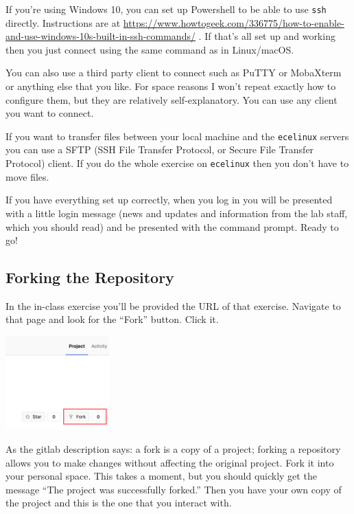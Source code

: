 If you're using Windows 10, you can set up Powershell to be able to use \texttt{ssh} directly. Instructions are at \url{https://www.howtogeek.com/336775/how-to-enable-and-use-windows-10s-built-in-ssh-commands/} . If that's all set up and working then you just connect using the same command as in Linux/macOS.

You can also use a third party client to connect such as PuTTY or MobaXterm or anything else that you like. For space reasons I won't repeat exactly how to configure them, but they are relatively self-explanatory. You can use any client you want to connect.

If you want to transfer files between your local machine and the \texttt{ecelinux} servers you can use a SFTP (SSH File Transfer Protocol, or Secure File Transfer Protocol) client. If you do the whole exercise on \texttt{ecelinux} then you don't have to move files.

If you have everything set up correctly, when you log in you will be presented with a little login message (news and updates and information from the lab staff, which you should read) and be presented with the command prompt. Ready to go!

\subsection*{Forking the Repository}
In the in-class exercise you'll be provided the URL of that exercise. Navigate to that page and look for the ``Fork'' button. Click it. 

\begin{center}
	\includegraphics[width=0.3\textwidth]{images/gitlab-fork.png}
\end{center}

As the gitlab description says: a fork is a copy of a project; forking a repository allows you to make changes without affecting the original project. Fork it into your personal space. This takes a moment, but you should quickly get the message ``The project was successfully forked.'' Then you have your own copy of the project and this is the one that you interact with.

